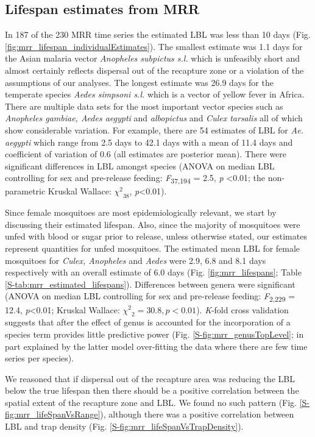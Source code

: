 \documentclass[]{article}
\begin{document}
\subsection{Lifespan estimates from
MRR}\label{lifespan-estimates-from-mrr}

In 187 of the 230 MRR time
series the estimated LBL was less than 10 days (Fig. \ref{fig:mrr_lifespan_individualEstimates}). The smallest
estimate was 1.1 days for the Asian malaria vector
\emph{Anopheles subpictus s.l.} which is unfeasibly short and almost
certainly reflects dispersal out of the recapture zone or a violation of
the assumptions of our analyses. The longest estimate was 26.9 days for
the temperate species \emph{Aedes simpsoni s.l.} which is a vector of
yellow fever in Africa. There are multiple data sets for the most
important vector species such as \emph{Anopheles gambiae, Aedes aegypti}
and \emph{albopictus} and \emph{Culex tarsalis} all of which show
considerable variation. For example, there are 54 estimates of LBL for
\emph{Ae. aegypti} which range from 2.5 days to 42.1 days with a mean of
11.4 days and coefficient of variation of 0.6 (all estimates are posterior mean). There were significant
differences in LBL amongst species (ANOVA on median LBL controlling for
sex and pre-release feeding: \emph{F}\textsubscript{37,194} = 2.5,
\emph{p} \textless{}0.01; the non-parametric Kruskal Wallace:
\({\chi^{2}}_{38}\), \emph{p}\textless{}0.01).

Since female mosquitoes are most epidemiologically relevant, we start by discussing their estimated lifespan. Also, since the majority of mosquitoes were unfed with blood or sugar prior to release, unless otherwise stated, our estimates represent quantities for unfed mosquitoes. The estimated mean LBL for female mosquitoes for \emph{Culex, Anopheles} and \emph{Aedes} were
2.9, 6.8 and 8.1 days respectively with an overall estimate of 6.0 days
(Fig. \ref{fig:mrr_lifespans}; Table \ref{S-tab:mrr_estimated_lifespans}). Differences between genera were significant (ANOVA on median
LBL controlling for sex and pre-release feeding:
\emph{F}\textsubscript{2,229} = 12.4, \emph{p}\textless{}0.01; Kruskal
Wallace: \({\chi^{2}}_{2} = 30.8,p < 0.01\)). \emph{K}-fold cross
validation suggests that after the effect of genus is accounted for the
incorporation of a species term provides little predictive power (Fig.
\ref{S-fig:mrr_genusTopLevel}; in part explained by the latter model over-fitting the data where
there are few time series per species).

We reasoned that if dispersal out of the recapture area was reducing the
LBL below the true lifespan then there should be a positive correlation
between the spatial extent of the recapture zone and LBL. We found no
such pattern (Fig. \ref{S-fig:mrr_lifeSpanVsRange}), although there was a positive correlation
between LBL and trap density (Fig. \ref{S-fig:mrr_lifeSpanVsTrapDensity}).
\end{document}
